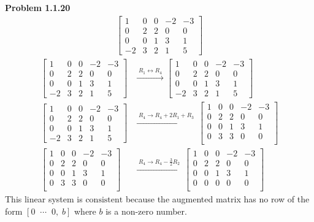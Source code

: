 \documentclass[12pt]{article}
\begin{document}
\newpage

\textbf{Problem 1.1.20} \begin{align*}
    \begin{bmatrix}
        1 & 0 & 0 & -2 & -3 \\
        0 & 2 & 2 & 0 & 0 \\
        0 & 0 & 1 & 3 & 1 \\
        -2 & 3 & 2 & 1 & 5
    \end{bmatrix}
\end{align*} \begin{align*}
    \begin{bmatrix}
        1 & 0 & 0 & -2 & -3 \\
        0 & 2 & 2 & 0 & 0 \\
        0 & 0 & 1 & 3 & 1 \\
        -2 & 3 & 2 & 1 & 5
    \end{bmatrix}
    & \xrightarrow{\; R_1 \leftrightarrow R_4 \;}
    \begin{bmatrix}
        1 & 0 & 0 & -2 & -3 \\
        0 & 2 & 2 & 0 & 0 \\
        0 & 0 & 1 & 3 & 1 \\
        -2 & 3 & 2 & 1 & 5
    \end{bmatrix} \\[6pt]
    \begin{bmatrix}
        1 & 0 & 0 & -2 & -3 \\
        0 & 2 & 2 & 0 & 0 \\
        0 & 0 & 1 & 3 & 1 \\
        -2 & 3 & 2 & 1 & 5
    \end{bmatrix}
    & \xrightarrow{\; R_4 \to R_4 + 2R_1 + R_3 \;}
    \begin{bmatrix}
        1 & 0 & 0 & -2 & -3 \\
        0 & 2 & 2 & 0 & 0 \\
        0 & 0 & 1 & 3 & 1 \\
        0 & 3 & 3 & 0 & 0 \\
    \end{bmatrix} \\[6pt]
    \begin{bmatrix}
        1 & 0 & 0 & -2 & -3 \\
        0 & 2 & 2 & 0 & 0 \\
        0 & 0 & 1 & 3 & 1 \\
        0 & 3 & 3 & 0 & 0 \\
    \end{bmatrix} 
    & \xrightarrow{\; R_4 \to R_4 - \frac{3}{2}R_2 \;}
    \begin{bmatrix}
        1 & 0 & 0 & -2 & -3 \\
        0 & 2 & 2 & 0 & 0 \\
        0 & 0 & 1 & 3 & 1 \\
        0 & 0 & 0 & 0 & 0 \\
    \end{bmatrix} 
\end{align*}
This linear system is $\boxed{\text{consistent}}$ because the augmented matrix has no row of the form $[0 \;\; \cdots \;\; 0, \; b]$ where $b$ is a non-zero number. \par
\end{document}

